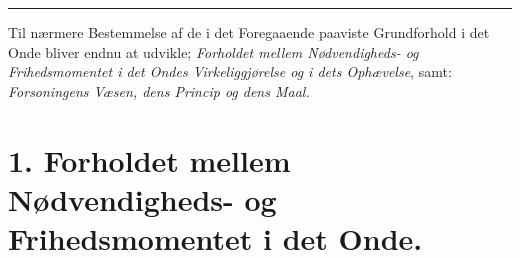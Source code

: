 \begin{center}\rule{2cm}{0.4pt}\end{center}

Til nærmere Bestemmelse af de i det Foregaaende paaviste Grundforhold i det Onde
bliver endnu at udvikle; \emph{Forholdet mellem Nødvendigheds- og
Frihedsmomentet i det Ondes Virkeliggjørelse og i dets Ophævelse}, samt:
\emph{Forsoningens Væsen, dens Princip og dens Maal.}

\section*{1. Forholdet mellem Nødvendigheds- og Frihedsmomentet i det Onde.}

